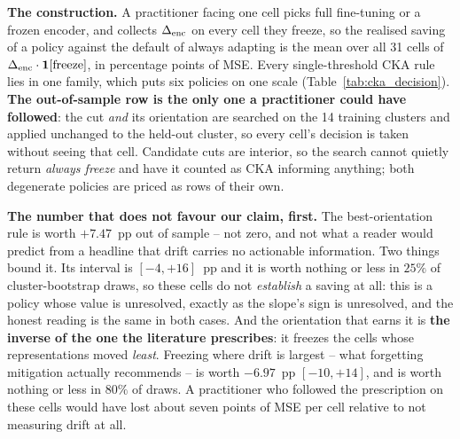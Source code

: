 \textbf{The construction.}  A practitioner facing one cell picks full fine-tuning or
a frozen encoder, and collects $\Delta_\text{enc}$ on every cell they freeze, so the realised
saving of a policy against the default of always adapting is the mean over all 31
cells of $\Delta_\text{enc} \cdot \mathbf{1}[\text{freeze}]$, in percentage points of MSE.
Every single-threshold CKA rule lies in one family, which puts six policies on one
scale (Table~\ref{tab:cka_decision}).  \textbf{The out-of-sample row is the only one
a practitioner could have followed}: the cut \emph{and} its orientation are searched
on the 14 training clusters and applied unchanged to the held-out cluster, so every
cell's decision is taken without seeing that cell.  Candidate cuts are interior, so
the search cannot quietly return \emph{always freeze} and have it counted as CKA
informing anything; both degenerate policies are priced as rows of their own.

\textbf{The number that does not favour our claim, first.}  The best-orientation
rule is worth $+7.47$~pp out of sample -- not zero, and not what a reader would
predict from a headline that drift carries no actionable information.  Two things
bound it.  Its interval is $[-4, +16]$~pp and it is worth nothing or less in $25\%$
of cluster-bootstrap draws, so these cells do not \emph{establish} a saving at all:
this is a policy whose value is unresolved, exactly as the slope's sign is
unresolved, and the honest reading is the same in both cases.  And the orientation
that earns it is \textbf{the inverse of the one the literature prescribes}: it
freezes the cells whose representations moved \emph{least}.  Freezing where drift is
largest -- what forgetting mitigation actually recommends -- is worth $-6.97$~pp
$[-10, +14]$, and is worth nothing or less in $80\%$ of draws.  A practitioner who
followed the prescription on these cells would have lost about seven points of MSE
per cell relative to not measuring drift at all.

